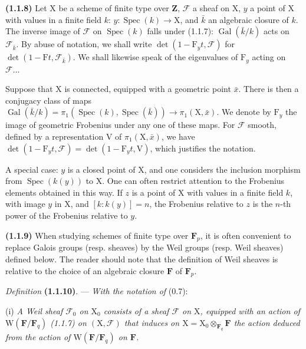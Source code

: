 \documentclass[11pt,leqno]{article}
\begin{document}
\textbf{(1.1.8)} Let \(\mathrm{X}\) be a scheme of finite type over \(\mathbf{Z}\), \(\mathscr{F}\) a sheaf on \(\mathrm{X}\), \(y\) a point of \(\mathrm{X}\) with values in a finite field \(k\): \(y:\operatorname{Spec}(k)\to\mathrm{X}\), and \(\bar k\) an algebraic closure of \(k\). The inverse image of \(\mathscr{F}\) on \(\operatorname{Spec}(k)\) falls under (1.1.7): \(\operatorname{Gal}(\bar k/k)\) acts on \(\mathscr{F}_{\bar k}\). By abuse of notation, we shall write \(\det(1-\mathrm{F}_y t,\mathscr{F})\) for \(\det(1-\mathrm{F}t,\mathscr{F}_{\bar k})\). We shall likewise speak of the eigenvalues of \(\mathrm{F}_y\) acting on \(\mathscr{F}\ldots\)

Suppose that \(\mathrm{X}\) is connected, equipped with a geometric point \(\bar x\). There is then a conjugacy class of maps \(\operatorname{Gal}(\bar k/k)=\pi_1(\operatorname{Spec}(k),\operatorname{Spec}(\bar k))\to\pi_1(\mathrm{X},\bar x)\). We denote by \(\mathrm{F}_y\) the image of geometric Frobenius under any one of these maps. For \(\mathscr{F}\) smooth, defined by a representation \(\mathrm{V}\) of \(\pi_1(\mathrm{X},\bar x)\), we have \(\det(1-\mathrm{F}_y t,\mathscr{F})=\det(1-\mathrm{F}_y t,\mathrm{V})\), which justifies the notation.

A special case: \(y\) is a closed point of \(\mathrm{X}\), and one considers the inclusion morphism from \(\operatorname{Spec}(k(y))\) to \(\mathrm{X}\). One can often restrict attention to the Frobenius elements obtained in this way. If \(z\) is a point of \(\mathrm{X}\) with values in a finite field \(k\), with image \(y\) in \(\mathrm{X}\), and \([k:k(y)]=n\), the Frobenius relative to \(z\) is the \(n\)-th power of the Frobenius relative to \(y\).

\textbf{(1.1.9)} When studying schemes of finite type over \(\mathbf{F}_p\), it is often convenient to replace Galois groups (resp. sheaves) by the Weil groups (resp. Weil sheaves) defined below. The reader should note that the definition of Weil sheaves is relative to the choice of an algebraic closure \(\mathbf{F}\) of \(\mathbf{F}_p\).

\textit{Definition} \textbf{(1.1.10)}. — \textit{With the notation of} (0.7):

(i) \textit{A \textup{Weil sheaf} \(\mathscr{F}_0\) on \(\mathrm{X}_0\) consists of a sheaf \(\mathscr{F}\) on \(\mathrm{X}\), equipped with an action of \(\mathrm{W}(\mathbf{F}/\mathbf{F}_q)\) \textup{(1.1.7)} on \((\mathrm{X},\mathscr{F})\) that induces on \(\mathrm{X}=\mathrm{X}_0\otimes_{\mathbf{F}_q}\mathbf{F}\) the action deduced from the action of \(\mathrm{W}(\mathbf{F}/\mathbf{F}_q)\) on \(\mathbf{F}\).}
\end{document}
